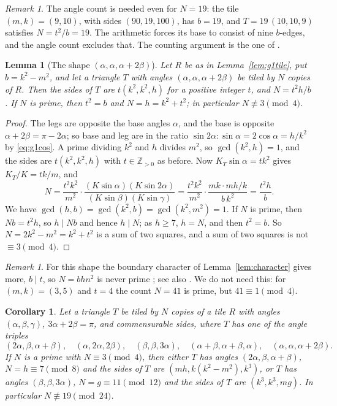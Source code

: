 \documentclass[11pt]{amsart}
\newtheorem{lemma}[theorem]{Lemma}
\newtheorem{corollary}[theorem]{Corollary}
\theoremstyle{remark}
\newtheorem{remark}[theorem]{Remark}
\newcommand{\Z}{\mathbb{Z}}
\begin{document}
\begin{remark}
The angle count is needed even for $N=19$: the tile $(m,k)=(9,10)$, with sides $(90,19,100)$, has $b=19$, and $T=19\,(10,10,9)$ satisfies $N=t^2/b=19$. The arithmetic forces its base to consist of nine $b$-edges, and the angle count excludes that. The counting argument is the one of \cite[Lemmas~6 and~7]{Beeson2229}.
\end{remark}

\begin{lemma}[The shape $(\alpha,\alpha,\alpha+2\beta)$]\label{lem:shape5}
Let $R$ be as in Lemma~\ref{lem:g1tile}, put $b=k^2-m^2$, and let a triangle $T$ with angles $(\alpha,\alpha,\alpha+2\beta)$ be tiled by $N$ copies of $R$. Then the sides of $T$ are $t(k^2,k^2,h)$ for a positive integer $t$, and $N=t^2h/b$. If $N$ is prime, then $t^2=b$ and $N=h=k^2+t^2$; in particular $N\not\equiv3\pmod4$.
\end{lemma}

\begin{proof}
The legs are opposite the base angles $\alpha$, and the base is opposite $\alpha+2\beta=\pi-2\alpha$; so base and leg are in the ratio $\sin2\alpha:\sin\alpha=2\cos\alpha=h/k^2$ by \eqref{eq:g1cos}. A prime dividing $k^2$ and $h$ divides $m^2$, so $\gcd(k^2,h)=1$, and the sides are $t(k^2,k^2,h)$ with $t\in\Z_{>0}$ as before. Now $K_T\sin\alpha=tk^2$ gives $K_T/K=tk/m$, and
\[
N=\frac{t^2k^2}{m^2}\cdot\frac{(K\sin\alpha)(K\sin2\alpha)}{(K\sin\beta)(K\sin\gamma)}
=\frac{t^2k^2}{m^2}\cdot\frac{mk\cdot mh/k}{b\,k^2}=\frac{t^2h}{b}.
\]
We have $\gcd(h,b)=\gcd(k^2,b)=\gcd(k^2,m^2)=1$. If $N$ is prime, then $Nb=t^2h$, so $h\mid Nb$ and hence $h\mid N$; as $h\ge7$, $h=N$, and then $t^2=b$. So $N=2k^2-m^2=k^2+t^2$ is a sum of two squares, and a sum of two squares is not $\equiv3\pmod4$.
\end{proof}

\begin{remark}
For this shape the boundary character of Lemma~\ref{lem:character} gives more, $b\mid t$, so $N=bhn^2$ is never prime \cite[Appendix~B.2]{Progress634}; see also \cite[Theorem~26]{Beeson2229}. We do not need this: for $(m,k)=(3,5)$ and $t=4$ the count $N=41$ is prime, but $41\equiv1\pmod4$.
\end{remark}

\begin{corollary}\label{cor:g1prime}
Let a triangle $T$ be tiled by $N$ copies of a tile $R$ with angles $(\alpha,\beta,\gamma)$, $3\alpha+2\beta=\pi$, and commensurable sides, where $T$ has one of the angle triples
\[
(2\alpha,\beta,\alpha+\beta),\quad(\alpha,2\alpha,2\beta),\quad(\beta,\beta,3\alpha),\quad(\alpha+\beta,\alpha+\beta,\alpha),\quad(\alpha,\alpha,\alpha+2\beta).
\]
If $N$ is a prime with $N\equiv3\pmod 4$, then either $T$ has angles $(2\alpha,\beta,\alpha+\beta)$, $N=h\equiv7\pmod8$ and the sides of $T$ are $(mh,k(k^2-m^2),k^3)$, or $T$ has angles $(\beta,\beta,3\alpha)$, $N=g\equiv11\pmod{12}$ and the sides of $T$ are $(k^3,k^3,mg)$. In particular $N\not\equiv19\pmod{24}$.
\end{corollary}
\end{document}
